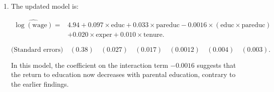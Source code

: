 \documentclass[12pt]{article}
\begin{document}
\begin{enumerate}
{\begin{enumerate}
\[
\widehat{\log(\text{wage})} = 5.65 + 0.047 \times \text{educ} + 0.00078 \times (\text{educ} \times \text{pareduc}) + 0.019 \times \text{exper} + 0.010 \times \text{tenure}.
\]

\[
\text{(Standard errors)} \quad (0.13) \quad (0.010) \quad (0.00021) \quad (0.004) \quad (0.003).
\]

The coefficient \( 0.00078 \) on \( \text{educ} \times \text{pareduc} \) indicates how much the return to an additional year of education increases with each additional year of parental education. 

To see this more clearly, we can compute the return to education for two specific values of \( \text{pareduc} \):
\begin{itemize}
    \item For \( \text{pareduc} = 32 \) (both parents have college education):
  \[
  \widehat{\frac{\Delta \log(\text{wage})}{\Delta \text{educ}}} = 0.047 + 0.00078 \times 32 = 0.07196.
  \]
  This suggests that the return to education is approximately 7.2\% when both parents have a college education.

  \item For \( \text{pareduc} = 24 \) (both parents have high school education):
  \[
  \widehat{\frac{\Delta \log(\text{wage})}{\Delta \text{educ}}} = 0.047 + 0.00078 \times 24 = 0.06572.
  \]
  This suggests that the return to education is approximately 6.6\% when both parents have a high school education.
\end{itemize}

The positive interaction suggests that the return to education is higher when parents are more educated, which aligns with the theoretical expectation.

\item The updated model is:

\begin{align}
\widehat{\log(\text{wage})} =& 4.94 + 0.097 \times \text{educ} + 0.033 \times \text{pareduc} - 0.0016 \times (\text{educ} \times \text{pareduc})\\
& + 0.020 \times \text{exper} + 0.010 \times \text{tenure}.
\end{align}

\[
\text{(Standard errors)} \quad (0.38) \quad (0.027) \quad (0.017) \quad (0.0012) \quad (0.004) \quad (0.003).
\]

In this model, the coefficient on the interaction term \( -0.0016 \) suggests that the return to education now decreases with parental education, contrary to the earlier findings. 


\end{enumerate}}
\end{enumerate}
\end{document}
